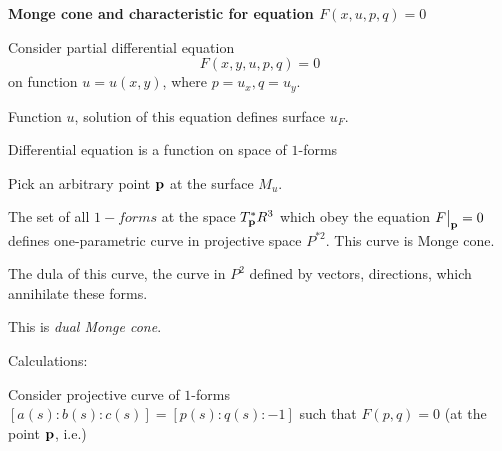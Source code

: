 




\baselineskip=17pt



\def\vare {\varepsilon}
\def\A {{\bf A}}
\def\t {\tilde}
\def\a {\alpha}
\def\K {{\bf K}}
\def\N {{\bf N}}
\def\V {{\cal V}}
\def\s {{\sigma}}
\def\S {{\bf S}}
\def\s {{\sigma}}
\def\bs {{\bf s}}
\def\p{\partial}
\def\vare{{\varepsilon}}
\def\Q {{\bf Q}}
\def\D {{\cal D}}
\def\P {{\cal P}}
\def\S {{\cal S}}
\def\L {{\cal L}}
\def\G {{\Gamma}}
\def\C {{\bf C}}
\def\M {{\cal M}}
\def\Z {{\bf Z}}
\def\U  {{\cal U}}
\def\H {{\cal H}}
\def\R  {{\bf R}}
\def\E  {{\bf E}}
\def\l {\lambda}
\def\degree {{\bf {\rm degree}\,\,}}
\def \finish {${\,\,\vrule height1mm depth2mm width 8pt}$}
\def \m {\medskip}
\def\p {\partial}
\def\r {{\bf r}}
\def\v {{\bf v}}
\def\n {{\bf n}}
\def\t {{\bf t}}
\def\b {{\bf b}}
\def\e{{\bf e}}
\def\f{{\bf f}}
\def\ac {{\bf a}}
\def \X   {{\bf X}}
\def \D   {{\cal D}}
\def \Y   {{\bf Y}}
\def\diag {\rm diag\,\,}
\def\pt {{\bf p}}
\def\w {\omega}
\def\la{\langle}
\def\ra{\rangle}
\def\x{{\bf x}}
\def\m {\medskip}
\def\thick {{\buildrel \to\over \to}}

  \centerline{\bf Monge cone and characteristic for equation
        $F(x,u,p,q)=0$}

  Consider partial differential equation
             $$
          F(x,y,u,p,q)=0
             $$
on function $u=u(x,y)$, where $p=u_x, q=u_y$.

Function $u$, solution of this equation defines surface $u_F$.

Differential equation is a function on space of $1$-forms


  Pick an arbitrary point $\pt$ at the surface $M_u$.

The set of all $1-forms$ at the space  $T^*_\pt R^3$
which obey the equation $F\big\vert_\pt=0$ defines
one-parametric curve in projective space $P^{*2}$.
  This curve is Monge cone.

The dula of this curve, the curve in $P^2$
defined by vectors, directions, which 
annihilate these forms.

   This is {\it dual Monge cone}.




    Calculations:
    
Consider projective curve  of $1$-forms $[a(s):b(s):c(s)]=[p(s):q(s):-1]$
such that $F(p,q)=0$ (at the point $\pt$, i.e.) 

